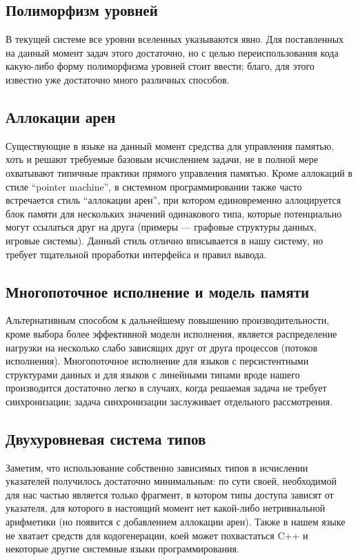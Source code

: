 \documentclass[12pt]{article}
\begin{document}
\subsection{Полиморфизм уровней}

В текущей системе все уровни вселенных указываются явно. Для поставленных на
данный момент задач этого достаточно, но с целью переиспользования кода
какую-либо форму полиморфизма уровней стоит ввести; благо, для этого известно
уже достаточно много различных способов.

\subsection{Аллокации арен}

Существующие в языке на данный момент средства для управления памятью, хоть и
решают требуемые базовым исчислением задачи, не в полной мере охватывают
типичные практики прямого управления памятью. Кроме аллокаций в стиле ``pointer
machine'', в системном программировании также часто встречается стиль
``аллокации арен'', при котором единовременно аллоцируется блок памяти для
нескольких значений одинакового типа, которые потенциально могут ссылаться друг
на друга (примеры --- графовые структуры данных, игровые системы). Данный стиль
отлично вписывается в нашу систему, но требует тщательной проработки интерфейса
и правил вывода.

\subsection{Многопоточное исполнение и модель памяти}

Альтернативным способом к дальнейшему повышению производительности, кроме выбора
более эффективной модели исполнения, является распределение нагрузки на
несколько слабо зависящих друг от друга процессов (потоков исполнения).
Многопоточное исполнение для языков с персистентными структурами данных и для
языков с линейными типами вроде нашего производится достаточно легко в случаях,
когда решаемая задача не требует синхронизации; задача синхронизации заслуживает
отдельного рассмотрения.

\subsection{Двухуровневая система типов}

Заметим, что использование собственно зависимых типов в исчислении указателей
получилось достаточно минимальным: по сути своей, необходимой для нас частью
является только фрагмент, в котором типы доступа зависят от указателя, для
которого в настоящий момент нет какой-либо нетривиальной арифметики (но появится
с добавлением аллокации арен). Также в нашем языке не хватает средств для
кодогенерации, коей может похвастаться C++ и некоторые другие системные языки
программирования.
\end{document}
